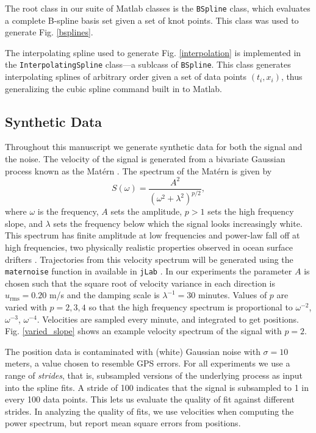 \documentclass{ametsoc}
\begin{document}
The root class in our suite of Matlab classes is the \texttt{BSpline} class, which evaluates a complete B-spline basis set given a set of knot points. This class was used to generate Fig. \ref{bsplines}.

The interpolating spline used to generate Fig. \ref{interpolation} is implemented in the \texttt{InterpolatingSpline} class---a sublcass of \texttt{BSpline}. This class generates interpolating splines of arbitrary order given a set of data points $(t_i, x_i)$, thus generalizing the cubic spline command built in to Matlab.

\subsection{Synthetic Data}
\label{subsec:synthetic_data}

Throughout this manuscript we generate synthetic data for both the signal and the noise. The velocity of the signal is generated from a bivariate Gaussian process known as the Mat\'ern \citep{lilly2017-npg}. The spectrum of the Mat\'ern is given by
\begin{equation}
S(\omega) = \frac{A^2}{(\omega^2 + \lambda^2)^{p/2}},
\end{equation}
where $\omega$ is the frequency, $A$ sets the amplitude, $p>1$ sets the high frequency slope, and $\lambda$ sets the frequency below which the signal looks increasingly white. This spectrum has finite amplitude at low frequencies and power-law fall off at high frequencies, two physically realistic properties observed in ocean surface drifters \citep{sykulski2016-jrssc}.
Trajectories from this velocity spectrum will be generated using the \texttt{maternoise} function in available in \texttt{jLab} \citep{jlab2019}. In our experiments the parameter $A$ is chosen such that the square root of velocity variance in each direction is $u_{\textrm{rms}}=0.20$ m/s and the damping scale is $\lambda^{-1}=30$ minutes. Values of $p$ are varied with $p=2,3,4$ so that the high frequency spectrum is proportional to $\omega^{-2}$, $\omega^{-3}$, $\omega^{-4}$. Velocities are sampled every minute, and integrated to get positions. Fig. \ref{varied_slope} shows an example velocity spectrum of the signal with $p=2$.

The position data is contaminated with (white) Gaussian noise with $\sigma=10$ meters, a value chosen to resemble GPS errors. For all experiments we use a range of \emph{strides}, that is, subsampled versions of the underlying process as input into the spline fits. A stride of 100 indicates that the signal is subsampled to 1 in every 100 data points. This lets us evaluate the quality of fit against different strides. In analyzing the quality of fits, we use velocities when computing the power spectrum, but report mean square errors from positions.
\end{document}
